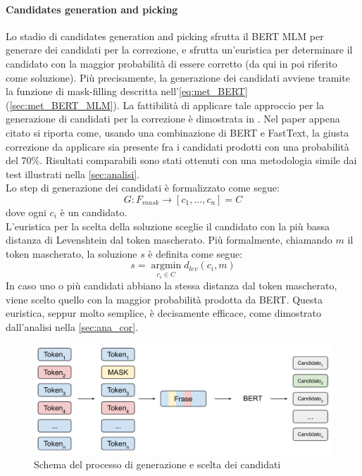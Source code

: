 \paragraph{Candidates generation and picking}
Lo stadio di candidates generation and picking sfrutta il BERT MLM per generare dei candidati per la correzione, e sfrutta un'euristica per determinare il candidato con la maggior probabilità di essere corretto (da qui in poi riferito come soluzione). Più precisamente, la generazione dei candidati avviene tramite la funzione di mask-filling descritta nell'\autoref{eq:met_BERT} (\autoref{sec:met_BERT_MLM}). La fattibilità di applicare tale approccio per la generazione di candidati per la correzione è dimostrata in \cite{OCRMaskFilling}. Nel paper appena citato si riporta come, usando una combinazione di BERT e FastText, la giusta correzione da applicare sia presente fra i candidati prodotti con una probabilità del 70\%. Risultati comparabili sono stati ottenuti con una metodologia simile dai test illustrati nella \autoref{sec:analisi}.\\
Lo step di generazione dei candidati è formalizzato come segue:
\begin{equation}
G: F_{mask} \rightarrow [c_1,...,c_n]= C
\end{equation}
dove ogni $c_i$ è un candidato.\\
L'euristica per la scelta della soluzione sceglie il candidato con la più bassa distanza di Levenshtein dal token mascherato. Più formalmente, chiamando $m$ il token mascherato, la soluzione $s$ è definita come segue:
\begin{equation}
s = \operatorname*{argmin}_{c_i \in C} d_{lev}(c_i,m)
\end{equation}
In caso uno o più candidati abbiano la stessa distanza dal token mascherato, viene scelto quello con la maggior probabilità prodotta da BERT. Questa euristica, seppur molto semplice, è decisamente efficace, come dimostrato dall'analisi nella \autoref{sec:ana_cor}.

\begin{figure}[H]
\centering
\includegraphics[width=\textwidth]{immagini/metodologia/generazione_candidati}
\caption{Schema del processo di generazione e scelta dei candidati}
\label{fig:met_errgen}
\end{figure}

